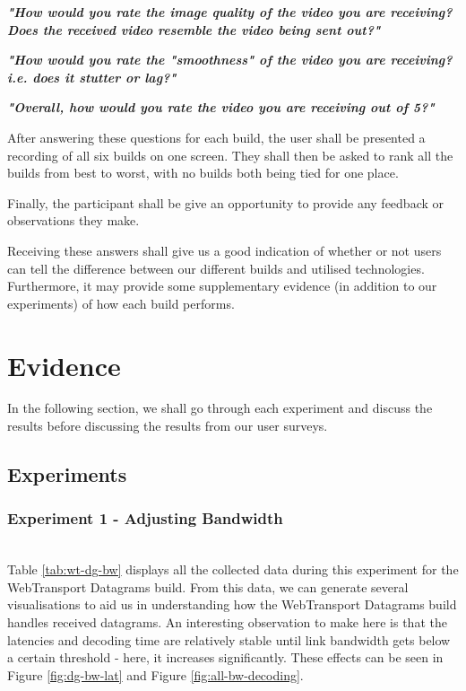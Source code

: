 \textbf{\textit{"How would you rate the image quality of the video you are receiving? Does the received video resemble the video being sent out?"}}

\textbf{\textit{"How would you rate the "smoothness" of the video you are receiving? i.e. does it stutter or lag?"}}

\textbf{\textit{"Overall, how would you rate the video you are receiving out of 5?"}}

After answering these questions for each build, the user shall be presented a recording of all six builds on one screen. They shall then be asked to rank all the builds from best to worst, with no builds both being tied for one place.

Finally, the participant shall be give an opportunity to provide any feedback or observations they make.

Receiving these answers shall give us a good indication of whether or not users can tell the difference between our different builds and utilised technologies. Furthermore, it may provide some supplementary evidence (in addition to our experiments) of how each build performs.

\section{Evidence}
In the following section, we shall go through each experiment and discuss the results before discussing the results from our user surveys.

\subsection{Experiments}

\subsubsection{Experiment 1 - Adjusting Bandwidth} 
\hfill{} \\
Table \ref{tab:wt-dg-bw} displays all the collected data during this experiment for the WebTransport Datagrams build. From this data, we can generate several visualisations to aid us in understanding how the WebTransport Datagrams build handles received datagrams.
An interesting observation to make here is that the latencies and decoding time are relatively stable until link bandwidth gets below a certain threshold - here, it increases significantly. These effects can be seen in Figure \ref{fig:dg-bw-lat} and Figure \ref{fig:all-bw-decoding}. 

